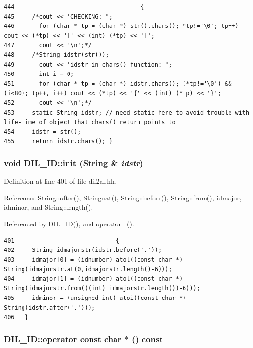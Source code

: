 \footnotesize\begin{verbatim}444                                    { 
445     /*cout << "CHECKING: ";
446       for (char * tp = (char *) str().chars(); *tp!='\0'; tp++) cout << (*tp) << '[' << (int) (*tp) << ']';
447       cout << '\n';*/
448     /*String idstr(str());
449       cout << "idstr in chars() function: ";
450       int i = 0;
451       for (char * tp = (char *) idstr.chars(); (*tp!='\0') && (i<80); tp++, i++) cout << (*tp) << '{' << (int) (*tp) << '}';
452       cout << '\n';*/
453     static String idstr; // need static here to avoid trouble with life-time of object that chars() return points to
454     idstr = str();
455     return idstr.chars(); }
\end{verbatim}\normalsize 
{}
\subsubsection{\setlength{\rightskip}{0pt plus 5cm}void DIL\_\-ID::init ({\bf String} \& {\em idstr})\hspace{0.3cm}{\tt  [inline, protected]}}\label{classDIL__ID_b0}




Definition at line 401 of file dil2al.hh.

References String::after(), String::at(), String::before(), String::from(), idmajor, idminor, and String::length().

Referenced by DIL\_\-ID(), and operator=().



\footnotesize\begin{verbatim}401                             {
402     String idmajorstr(idstr.before('.'));
403     idmajor[0] = (idnumber) atol((const char *) String(idmajorstr.at(0,idmajorstr.length()-6)));
404     idmajor[1] = (idnumber) atol((const char *) String(idmajorstr.from(((int) idmajorstr.length())-6)));
405     idminor = (unsigned int) atoi((const char *) String(idstr.after('.')));
406   }
\end{verbatim}\normalsize 
{}
\subsubsection{\setlength{\rightskip}{0pt plus 5cm}DIL\_\-ID::operator const char $\ast$ () const\hspace{0.3cm}{\tt  [inline]}}\label{classDIL__ID_a16}




